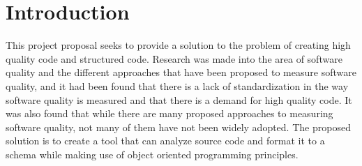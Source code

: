 \section{Introduction} %
This project proposal seeks to provide a solution to the problem of creating high quality code and structured code. Research was made into the area of software quality and the different approaches that have been proposed to measure software quality, and it had been found that there is a lack of standardization in the way software quality is measured and that there is a demand for high quality code. It was also found that while there are many proposed approaches to measuring software quality, not many of them have not been widely adopted. The proposed solution is to create a tool that can analyze source code and format it to a schema while making use of object oriented programming principles.
